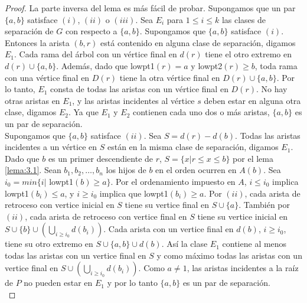 \begin{proof}
La parte inversa del lema es más fácil de probar. Supongamos que un par $\{a, b\}$ satisface $\left(i\right)$, $\left(ii\right)$ o $\left(iii\right)$. Sea $E_{i}$ para $1 \leq i \leq k$ las clases de separación de $G$ con respecto a $\{a, b\}$. Supongamos que $\{a, b\}$ satisface $\left(i\right)$. Entonces la arista $\left(b, r\right)$ está contenido en alguna clase de separación, digamos $E_{1}$. Cada rama del árbol con un vértice final en $d\left(r\right)$ tiene el otro extremo en $d\left(r\right) \cup \{a, b\}$. Además, dado que lowpt1$\left(r\right) = a$ y lowpt2$\left(r\right) \geq b$, toda rama con una vértice final en $D\left(r\right)$ tiene la otra vértice final en $D\left(r\right) \cup \{a, b\}$. Por lo tanto, $E_{1}$ consta de todas las aristas con un vértice final en $D\left(r\right)$. No hay otras aristas en $E_{1}$, y las aristas incidentes al vértice $s$ deben estar en alguna otra clase, digamos $E_{2}$. Ya que $E_{1}$ y $E_{2}$ contienen cada uno dos o más aristas, $\{a, b\}$ es un par de separación.\\

Supongamos que $\{a, b\}$ satisface $\left(ii\right)$. Sea $S = d\left(r\right) - d\left(b\right)$. Todas las aristas incidentes a un vértice en $S$ están en la misma clase de separación, digamos $E_{1}$. Dado que $b$ es un primer descendiente de $r$, $S = \{x | r \leq x \le b\}$ por el lema \ref{lema:3.1}. Sean $b_{1}, b_{2}, \ldots, b_{n}$ los hijos de $b$ en el orden ocurren en $A\left(b\right)$. Sea $i_{0} = min\{i | $ lowpt1$\left(b\right) \geq a\}$. Por el ordenamiento impuesto en $A$, $i \le i_{0}$ implica lowpt1$\left(b_{i}\right) \le a$, y $i \geq i_{0}$ implica que lowpt1$\left(b_{i}\right) \geq a$. Por $\left(ii\right)$, cada arista de retroceso con vertice inicial en $S$ tiene su vertice final en $S \cup \{a\}$. También por $\left(ii\right)$, cada arista de retroceso con vertice final en $S$ tiene su vertice inicial en $S \cup \{b\} \cup \left(\bigcup_{i\geq i_{0}}d\left(b_{i}\right)\right)$. Cada arista con un vertice final en $d\left(b\right)$, $i \geq i_{0}$, tiene su otro extremo en $S \cup \{a, b\} \cup d\left(b\right)$. Así la clase $E_{1}$ contiene al menos todas las aristas con un vertice final en $S$ y como máximo todas las aristas con un vertice final en $S \cup (\bigcup_{i\geq i_{0}}d(b_{i}))$. Como $a \neq 1$, las aristas incidentes a la raíz de $P$ no pueden estar en $E_{1}$ y por lo tanto $\{a, b\}$ es un par de separación.\\


\end{proof}
